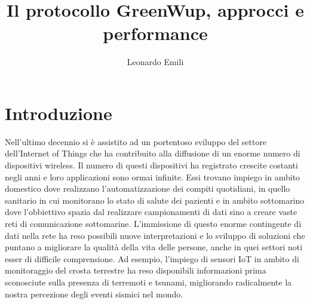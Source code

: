 \documentclass[binding=0.6cm,TFA]{sapthesis}
\title{Il protocollo GreenWup, approcci e performance}
\author{Leonardo Emili}
\begin{document}
\frontmatter
\maketitle

\tableofcontents

\mainmatter
\chapter{Introduzione}


Nell'ultimo decennio si è assistito ad un portentoso sviluppo del settore dell'Internet of Things che ha contribuito alla diffusione
di un enorme numero di dispositivi wireless. Il numero di questi dispositivi ha registrato crescite costanti negli anni e loro applicazioni sono ormai infinite.
Essi trovano impiego in ambito domestico dove realizzano l'automatizzazione dei compiti quotidiani, in quello sanitario in cui monitorano lo stato di salute
dei pazienti e in ambito sottomarino dove l'obbiettivo spazia dal realizzare campionamenti di dati sino a creare vaste reti di comunicazione sottomarine.
L'immissione di questo enorme contingente di dati nella rete ha reso possibili nuove interpretazioni e lo sviluppo di soluzioni che puntano a 
migliorare la qualità della vita delle persone, anche in quei settori noti esser di difficile comprensione. Ad esempio, l'impiego di sensori IoT in ambito di
monitoraggio del crosta terrestre ha reso disponibili informazioni prima sconosciute sulla presenza di terremoti e tsunami, migliorando radicalmente
la nostra percezione degli eventi sismici nel mondo.\\
\end{document}
